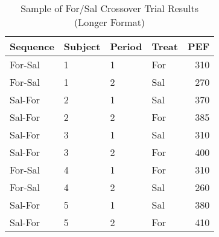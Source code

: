 \begin{table}
\centering
\caption{Sample of For/Sal Crossover Trial Results (Longer Format)}
\centering
\begin{tabular}[t]{l|l|l|l|r}
\hline
\textbf{Sequence} & \textbf{Subject} &
\textbf{Period} & \textbf{Treat} & \textbf{PEF}\\
\hline
For-Sal & 1 & 1 & For & 310\\
\hline
For-Sal & 1 & 2 & Sal & 270\\
\hline
Sal-For & 2 & 1 & Sal & 370\\
\hline
Sal-For & 2 & 2 & For & 385\\
\hline
Sal-For & 3 & 1 & Sal & 310\\
\hline
Sal-For & 3 & 2 & For & 400\\
\hline
For-Sal & 4 & 1 & For & 310\\
\hline
For-Sal & 4 & 2 & Sal & 260\\
\hline
Sal-For & 5 & 1 & Sal & 380\\
\hline
Sal-For & 5 & 2 & For & 410\\
\hline
\end{tabular}
\label{crossoverDataLong}
\end{table}
